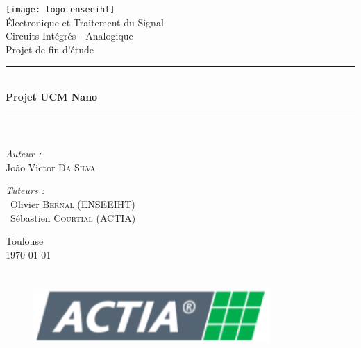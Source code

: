 \documentclass[a4paper,12pt,openany]{book}
\theoremstyle{break}
\begin{document}

\begin{titlepage}
\begin{center}

\texttt{[image: logo-enseeiht]}\\

{\LARGE Électronique et Traitement du Signal \\[0.2cm] Circuits Intégrés - Analogique}\\[0.30cm]

{\LARGE Projet de fin d'étude}\\[2.5cm]

\rule{\linewidth}{0.5mm} \\[0.4cm]
{ \huge \bfseries Projet UCM Nano\\[0.4cm] }
\rule{\linewidth}{0.5mm} \\[2.5cm]

\noindent
\begin{minipage}{0.4\textwidth}
  \begin{flushleft} \large
    \emph{Auteur :}\\
    João Victor \textsc{Da Silva}
  \end{flushleft}
\end{minipage}%
\begin{minipage}{0.5\textwidth}
  \begin{flushright} \large
    \emph{Tuteurs :} \\
    ~Olivier \textsc{Bernal} (ENSEEIHT)\\
    ~Sébastien \textsc{Courtial} (ACTIA)
  \end{flushright}
\end{minipage}

\vfill

{\large Toulouse\\ \today}

\end{center}
\end{titlepage}


\frontmatter
\clearpage

\chapter*{}
\begin{figure}[!t]
    \centering
    \includegraphics[width=0.80\textwidth]{logo-actia}\\
\end{figure}
\end{document}
